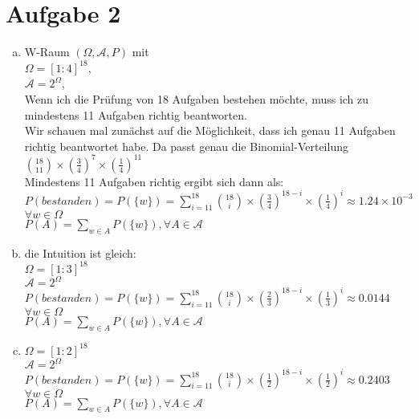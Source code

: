 \documentclass[10pt,a4paper]{article}
\begin{document}
\section*{Aufgabe 2}
\begin{enumerate}[a)]
 \item 
 W-Raum $(\Omega, \mathcal{A}, P)$ mit \\
 $\Omega = [1:4]^{18}$,\\
 $\mathcal{A} = 2^\Omega$,\\
 
 
 Wenn ich die Prüfung von 18 Aufgaben bestehen möchte, muss ich zu mindestens 11 Aufgaben richtig beantworten.\\
 Wir schauen mal zunächst auf die Möglichkeit, dass ich genau 11 Aufgaben richtig beantwortet habe. Da passt genau die Binomial-Verteilung\\
 $\binom{18}{11} \times (\frac{3}{4})^7 \times (\frac{1}{4})^{11}$\\
 Mindestens 11 Aufgaben richtig ergibt sich dann als:\\
 $P(bestanden) = P(\{w\}) = \sum_{i=11}^{18} \binom{18}{i} \times (\frac{3}{4})^{18-i} \times (\frac{1}{4})^i \approx 1.24 \times 10^{-3} $ \\
 $\forall w\in \Omega$\\
  $P(A) = \sum_{w\in A}P(\{w\}),\forall A \in \mathcal{A}$\\
 
 \item
 die Intuition ist gleich:\\
  $\Omega = [1:3]^{18}$\\
 $\mathcal{A} = 2^\Omega$\\
 $P(bestanden) = P(\{w\})= \sum_{i=11}^{18} \binom{18}{i} \times (\frac{2}{3})^{18-i} \times (\frac{1}{3})^i \approx 0.0144$ \\
  $\forall w\in \Omega$\\
  $P(A) = \sum_{w\in A}P(\{w\}),\forall A \in \mathcal{A}$\\

 
\item
$\Omega = [1:2]^{18}$\\
$\mathcal{A} = 2^\Omega$\\
$P(bestanden) = P(\{w\})=\sum_{i=11}^{18} \binom{18}{i} \times (\frac{1}{2})^{18-i} \times (\frac{1}{2})^i \approx 0.2403$ \\
  $\forall w\in \Omega$\\
  $P(A) = \sum_{w\in A}P(\{w\}),\forall A \in \mathcal{A}$\\

\end{enumerate}
\end{document}
